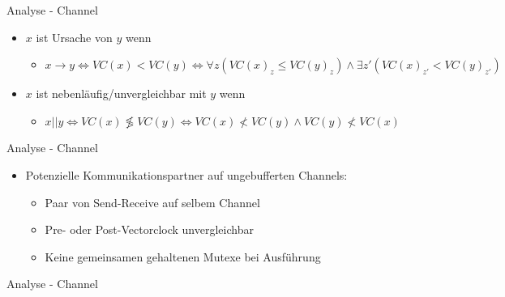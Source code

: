 \documentclass[aspectratio=169]{beamer}  %
\begin{document}
\begin{frame}{Analyse - Channel}
  \begin{itemize}
    \item $x$ ist Ursache von $y$ wenn
    \begin{itemize}
      \item $x \to y \Leftrightarrow VC(x) < VC(y) \Leftrightarrow \forall z (VC(x)_z \leq VC(y)_z) \land \exists z' (VC(x)_{z'} < VC(y)_{z'})$  
    \end{itemize}
    \item $x$ ist nebenläufig/unvergleichbar mit $y$ wenn
    \begin{itemize}
      \item $ x || y \Leftrightarrow VC(x) \not \lessgtr VC(y) \Leftrightarrow VC(x) \nless VC(y) \land VC(y) \nless VC(x)$
    \end{itemize}
  \end{itemize}
\end{frame}

\begin{frame}{Analyse - Channel}
  \begin{itemize}
    \item Potenzielle Kommunikationspartner auf ungebufferten Channels:
    \begin{itemize}
      \item Paar von Send-Receive auf selbem Channel
      \item Pre- oder Post-Vectorclock unvergleichbar
      \item Keine gemeinsamen gehaltenen Mutexe bei Ausführung
    \end{itemize}
  \end{itemize}
\end{frame}

\begin{frame}{Analyse - Channel}
  
\end{frame}
\end{document}

